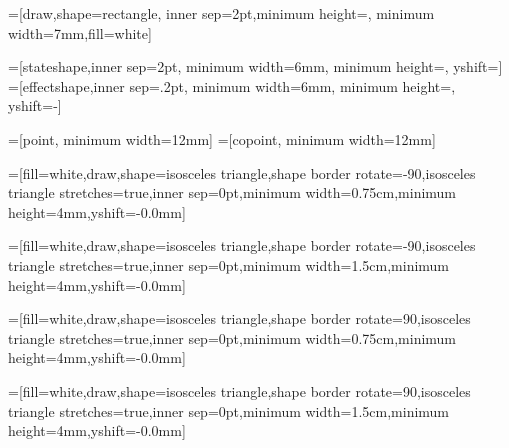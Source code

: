  =[draw,shape=rectangle, inner sep=2pt,minimum height=\mapminh, minimum width=7mm,fill=white]

=[stateshape,inner sep=2pt, minimum width=6mm, minimum height=\stateminh, yshift=\stateshift]
=[effectshape,inner sep=.2pt, minimum width=6mm, minimum height=\stateminh, yshift=-\effectshift]

=[point, minimum width=12mm]
=[copoint, minimum width=12mm]











=[fill=white,draw,shape=isosceles triangle,shape border rotate=-90,isosceles triangle stretches=true,inner sep=0pt,minimum width=0.75cm,minimum height=4mm,yshift=-0.0mm]

=[fill=white,draw,shape=isosceles triangle,shape border rotate=-90,isosceles triangle stretches=true,inner sep=0pt,minimum width=1.5cm,minimum height=4mm,yshift=-0.0mm]

=[fill=white,draw,shape=isosceles triangle,shape border rotate=90,isosceles triangle stretches=true,inner sep=0pt,minimum width=0.75cm,minimum height=4mm,yshift=-0.0mm]

=[fill=white,draw,shape=isosceles triangle,shape border rotate=90,isosceles triangle stretches=true,inner sep=0pt,minimum width=1.5cm,minimum height=4mm,yshift=-0.0mm]


